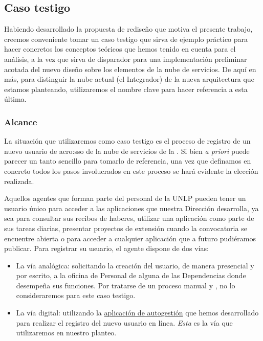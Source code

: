 \subsection{Caso testigo}
\label{caso-testigo}

Habiendo desarrollado la propuesta de rediseño que motiva el presente trabajo, creemos conveniente tomar un caso testigo que sirva de ejemplo práctico para hacer concretos los conceptos teóricos que hemos tenido en cuenta para el análisis, a la vez que sirva de disparador para una implementación preliminar acotada del nuevo diseño sobre los elementos de la nube de servicios. De aquí en más, para distinguir la nube actual (el Integrador) de la nueva arquitectura que estamos planteando, utilizaremos el nombre clave \cloud para hacer referencia a esta última.

\subsubsection{Alcance}

La situación que utilizaremos como caso testigo es el proceso de registro de un nuevo usuario de \gls{acro:sso} de la nube de servicios de la \unlp. Si bien \textit{a priori} puede parecer un tanto sencillo para tomarlo de referencia, una vez que definamos en concreto todos los pasos involucrados en este proceso se hará evidente la elección realizada.

Aquellos agentes que forman parte del personal de la UNLP pueden tener un usuario único para acceder a las aplicaciones que nuestra Dirección desarrolla, ya sea para consultar sus recibos de haberes, utilizar una aplicación como parte de sus tareas diarias, presentar proyectos de extensión cuando la convocatoria se encuentre abierta o para acceder a cualquier aplicación que a futuro pudiéramos publicar. Para registrar su usuario, el agente dispone de dos vías:

\begin{itemize}
  \item La vía analógica: solicitando la creación del usuario, de manera presencial y por escrito, a la oficina de Personal de alguna de las Dependencias donde desempeña sus funciones. Por tratarse de un proceso manual y , no lo consideraremos para este caso testigo.

  \item La vía digital: utilizando la \hyperref[anexo:detalle-clientes:sso]{aplicación de autogestión} que hemos desarrollado para realizar el registro del nuevo usuario en línea. \textit{Esta} es la vía que utilizaremos en nuestro planteo.
\end{itemize}


